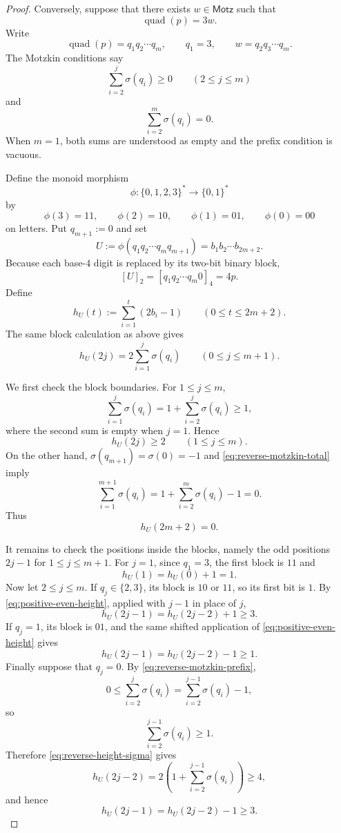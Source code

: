 \documentclass[12pt]{article}
\theoremstyle{plain}
\theoremstyle{definition}
\theoremstyle{plain}
\begin{document}
\begin{proof}
Conversely, suppose that there exists $w\in\mathsf{Motz}$ such that
\[
 \operatorname{quad}(p)=3w.
\]
Write
\[
 \operatorname{quad}(p)=q_1q_2\cdots q_m,
 \qquad
 q_1=3,
 \qquad
 w=q_2q_3\cdots q_m.
\]
The Motzkin conditions say
\begin{equation}\label{eq:reverse-motzkin-prefix}
 \sum_{i=2}^{j}\sigma(q_i)\geq0
 \qquad(2\leq j\leq m)
\end{equation}
and
\begin{equation}\label{eq:reverse-motzkin-total}
 \sum_{i=2}^{m}\sigma(q_i)=0.
\end{equation}
When $m=1$, both sums are understood as empty and the prefix condition is
vacuous.

Define the monoid morphism
\[
 \phi:\{0,1,2,3\}^*\longrightarrow\{0,1\}^*
\]
by
\[
 \phi(3)=11,\qquad
 \phi(2)=10,\qquad
 \phi(1)=01,\qquad
 \phi(0)=00
\]
on letters.  Put $q_{m+1}:=0$ and set
\[
 U:=\phi(q_1q_2\cdots q_mq_{m+1})
   =b_1b_2\cdots b_{2m+2}.
\]
Because each base-$4$ digit is replaced by its two-bit binary block,
\begin{equation}\label{eq:block-value}
 [U]_2=[q_1q_2\cdots q_m0]_4=4p.
\end{equation}
Define
\[
 h_U(t):=\sum_{i=1}^{t}(2b_i-1)
 \qquad(0\leq t\leq2m+2).
\]
The same block calculation as above gives
\begin{equation}\label{eq:reverse-height-sigma}
 h_U(2j)=2\sum_{i=1}^{j}\sigma(q_i)
 \qquad(0\leq j\leq m+1).
\end{equation}

We first check the block boundaries.  For $1\leq j\leq m$,
\[
 \sum_{i=1}^{j}\sigma(q_i)
 =1+\sum_{i=2}^{j}\sigma(q_i)
 \geq1,
\]
where the second sum is empty when $j=1$.  Hence
\begin{equation}\label{eq:positive-even-height}
 h_U(2j)\geq2
 \qquad(1\leq j\leq m).
\end{equation}
On the other hand, $\sigma(q_{m+1})=\sigma(0)=-1$ and
\eqref{eq:reverse-motzkin-total} imply
\[
 \sum_{i=1}^{m+1}\sigma(q_i)
 =1+\sum_{i=2}^{m}\sigma(q_i)-1=0.
\]
Thus
\begin{equation}\label{eq:terminal-height}
 h_U(2m+2)=0.
\end{equation}

It remains to check the positions inside the blocks, namely the odd positions
$2j-1$ for $1\leq j\leq m+1$.  For $j=1$, since $q_1=3$, the first block
is $11$ and
\[
 h_U(1)=h_U(0)+1=1.
\]
Now let $2\leq j\leq m$.  If $q_j\in\{2,3\}$, its block is $10$ or $11$,
so its first bit is $1$.  By \eqref{eq:positive-even-height}, applied with
$j-1$ in place of $j$,
\[
 h_U(2j-1)=h_U(2j-2)+1\geq3.
\]
If $q_j=1$, its block is $01$, and the same shifted application of
\eqref{eq:positive-even-height} gives
\[
 h_U(2j-1)=h_U(2j-2)-1\geq1.
\]
Finally suppose that $q_j=0$.  By
\eqref{eq:reverse-motzkin-prefix},
\[
 0\leq\sum_{i=2}^{j}\sigma(q_i)
 =\sum_{i=2}^{j-1}\sigma(q_i)-1,
\]
so
\[
 \sum_{i=2}^{j-1}\sigma(q_i)\geq1.
\]
Therefore \eqref{eq:reverse-height-sigma} gives
\[
 h_U(2j-2)
 =2\left(1+\sum_{i=2}^{j-1}\sigma(q_i)\right)
 \geq4,
\]
and hence
\[
 h_U(2j-1)=h_U(2j-2)-1\geq3.
\]


\end{proof}
\end{document}
